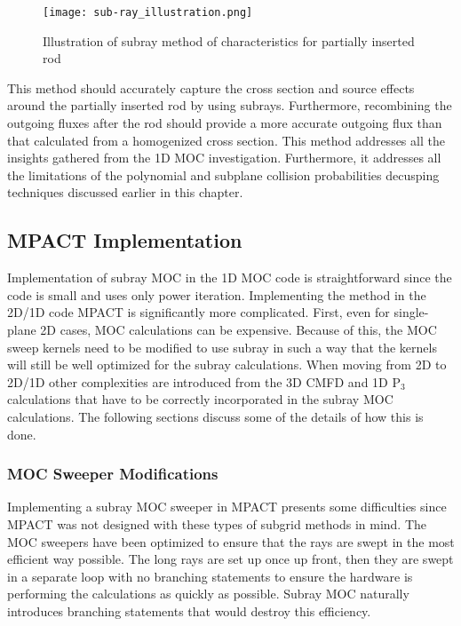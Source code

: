 \begin{figure}
    \centering
    \texttt{[image: sub-ray\_illustration.png]}
    \caption{Illustration of subray method of characteristics for partially inserted rod}\label{f:subrayMOC}
\end{figure}

This method should accurately capture the cross section and source effects around the partially inserted rod by using subrays.  Furthermore, recombining the outgoing fluxes after the rod should provide a more accurate outgoing flux than that calculated from a homogenized cross section.  This method addresses all the insights gathered from the 1D MOC investigation.  Furthermore, it addresses all the limitations of the polynomial and subplane collision probabilities decusping techniques discussed earlier in this chapter.

\subsection{MPACT Implementation}

Implementation of subray MOC in the 1D MOC code is straightforward since the code is small and uses only power iteration.  Implementing the method in the 2D/1D code MPACT is significantly more complicated.  First, even for single-plane 2D cases, MOC calculations can be expensive.  Because of this, the MOC sweep kernels need to be modified to use subray in such a way that the kernels will still be well optimized for the subray calculations.  When moving from 2D to 2D/1D other complexities are introduced from the 3D CMFD and 1D P$_3$ calculations that have to be correctly incorporated in the subray MOC calculations.  The following sections discuss some of the details of how this is done.

\subsubsection{MOC Sweeper Modifications}

Implementing a subray MOC sweeper in MPACT presents some difficulties since MPACT was not designed with these types of subgrid methods in mind.  The MOC sweepers have been optimized to ensure that the rays are swept in the most efficient way possible.  The long rays are set up once up front, then they are swept in a separate loop with no branching statements to ensure the hardware is performing the calculations as quickly as possible.  Subray MOC naturally introduces branching statements that would destroy this efficiency.


